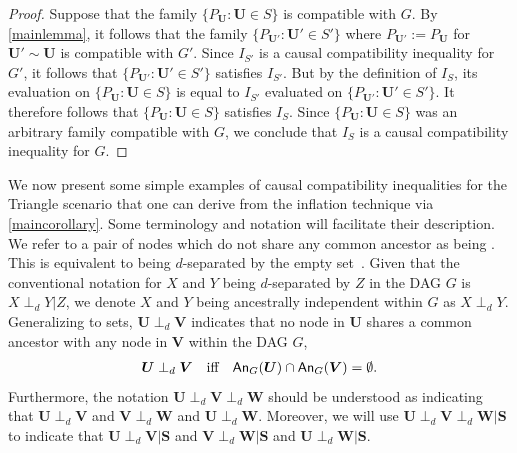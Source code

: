 \documentclass[aps,english,10pt,superscriptaddress,onecolumn,twoside,longbibliography,pra,floatfix,fleqn,nofootinbib]{revtex4-1}%
\newcommand*{\tblue}[1]{{\color{MidnightBlue}{\textbf{#1}}}}
\theoremstyle{definition}
\newcounter{example}[section]
\newcommand{\An}[2][]{{\mathsf{An}_{#1}}\parenths{#2}}
\newcommand{\aindep}{\ensuremath{\perp_d}} %
\DeclarePairedDelimiter{\parenths}{\lparen}{\rparen}
\begin{document}
\begin{proof}
Suppose that the family $\{ P_{\bm{U}} : \bm{U} \in S\}$ is compatible with $G$.  By \cref{mainlemma}, it follows that the family $ \{ P_{\bm{U}'} : \bm{U}' \in S'\}$ where $P_{\bm{U}'}:= P_{\bm{U}}$ for $\bm{U}' \sim \bm{U}$  is compatible with $G'$.  Since $I_{S'}$ is a causal compatibility inequality for $G'$, it follows that $\{ P_{\bm{U}'} : \bm{U}' \in S'\}$ satisfies $I_{S'}$.  But by the definition of $I_{S}$, its evaluation on $\{ P_{\bm{U}} : \bm{U} \in S\}$ is equal to $I_{S'}$ evaluated on $\{ P_{\bm{U}'} : \bm{U}' \in S'\}$. It therefore follows that $\{ P_{\bm{U}} : \bm{U} \in S\}$ satisfies $I_{S}$. Since $\{ P_{\bm{U}} : \bm{U}\in S\}$ was an arbitrary family compatible with $G$, we conclude that $I_{S}$ is a causal compatibility inequality for $G$.
\end{proof}

We now present some simple examples of causal compatibility inequalities for the Triangle scenario that one can derive from the inflation technique via \cref{maincorollary}. Some terminology and notation will facilitate their description. We refer to a pair of nodes which do not share any common ancestor as being \tblue{ancestrally independent}. This is equivalent to being $d$-separated by the empty set~\cite{pearl2009causality,spirtes2011causation,studeny2005probabilistic,koller2009probabilistic}.  Given that the conventional notation for $X$ and $Y$ being $d$-separated by $Z$ in the DAG $G$ is $X\aindep Y|Z$, we denote $X$ and $Y$ being ancestrally independent within $G$ as $X\aindep Y$.  Generalizing to sets, $\bm{U}\aindep \bm{V}$ indicates that no node in $\bm{U}$ shares a common ancestor with any node in $\bm{V}$ within the DAG $G$, 
\begin{align}
\bm{U}\aindep \bm{V} \quad \text{iff} \quad \An[G]{\bm{U}}\cap\An[G]{\bm{V}}=\emptyset.
\end{align}
Furthermore, the notation ${\bm{U}\aindep \bm{V}\aindep \bm{W}}$ should be understood as indicating that $\bm{U}\aindep \bm{V}$ and $\bm{V}\aindep \bm{W}$ and $\bm{U}\aindep \bm{W}$. Moreover, we will use ${\bm{U}\aindep \bm{V}\aindep \bm{W} | \bm{S}}$ to indicate that $\bm{U}\aindep \bm{V}| \bm{S}$ and $\bm{V}\aindep \bm{W}| \bm{S}$ and $\bm{U}\aindep \bm{W}| \bm{S}$.
\end{document}
